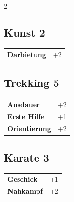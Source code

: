 \begin{multicols}{2}
\begin{tcolorbox}
\end{tcolorbox}

\begin{tcolorbox}
    \subsection*{Kunst \hfill \small{2 }}
    \tcblower




\begin{tabular}{@{}ll@{}}
    \textbf{Darbietung} & +2\\
\end{tabular}


\end{tcolorbox}

\begin{tcolorbox}
    \subsection*{Trekking \hfill \small{5 }}
    \tcblower




\begin{tabular}{@{}ll@{}}
    \textbf{Ausdauer} & +2\\
    \textbf{Erste Hilfe} & +1\\
    \textbf{Orientierung} & +2\\
\end{tabular}


\end{tcolorbox}

\begin{tcolorbox}
    \subsection*{Karate \hfill \small{3 }}
    \tcblower




\begin{tabular}{@{}ll@{}}
    \textbf{Geschick} & +1\\
    \textbf{Nahkampf} & +2\\
\end{tabular}


\end{tcolorbox}
\end{multicols}
